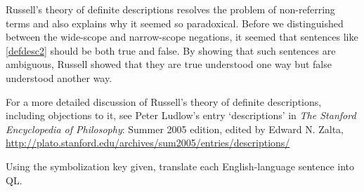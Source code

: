 Russell's theory of definite descriptions resolves the problem of non-referring terms and also explains why it seemed so paradoxical. Before we distinguished between the wide-scope and narrow-scope negations, it seemed that sentences like \ref{defdesc2} should be both true and false. By showing that such sentences are ambiguous, Russell showed that they are true understood one way but false understood another way.

For a more detailed discussion of Russell's theory of definite descriptions, including objections to it, see Peter Ludlow's entry `descriptions' in \emph{The Stanford Encyclopedia of Philosophy}: Summer 2005 edition, edited by Edward N. Zalta, \url{http://plato.stanford.edu/archives/sum2005/entries/descriptions/}




\practiceproblems

\solutions
\problempart
\label{pr.QLalligators}
Using the symbolization key given, translate each English-language sentence into QL.

